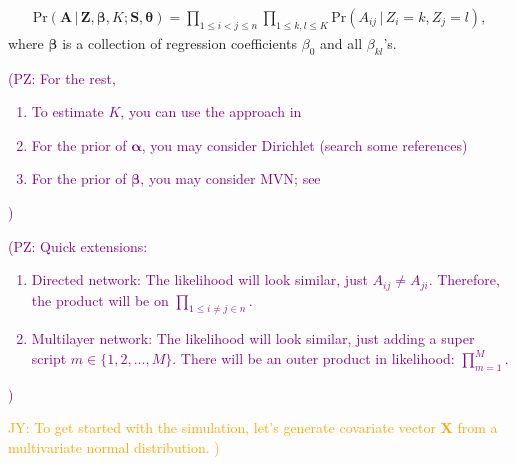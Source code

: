 \documentclass[12pt, titlepage, a4paper]{article}
\newcommand{\Prob}{\bm{\mathrm{Pr}}}
\newcommand{\given}{\, \vert \,}
\newcommand{\pz}[1]{\textcolor{purple}{(PZ: #1)}}
\newcommand{\jy}[1]{\textcolor{orange}{JY: #1)}}
\begin{document}
\begin{align*}
\Prob(\bm{A} \given \bm{Z}, \bm{\beta}, K; \bm{S}, \bm{\theta}) = 
\prod_{1 \le i < j \le n}\prod_{1 \le k, l \le K}\Prob(A_{ij}\given 
Z_i = k, Z_j = l),
\end{align*}
where $\bm{\beta}$ is a collection of regression coefficients 
$\beta_0$ and all $\beta_{kl}$'s.

\pz{For the rest,
\begin{enumerate}
\item To estimate $K$, you can use the approach 
in~\citet{geng2019probabilistic}
\item For the prior of $\bm{\alpha}$, you may consider Dirichlet 
(search some references)
\item For the prior of $\bm{\beta}$, you may consider MVN; 
see~\citet{handcock2007model}
\end{enumerate}
}

\pz{Quick extensions:
\begin{enumerate}
\item Directed network: The likelihood will look similar, just 
$A_{ij} \neq A_{ji}$. Therefore, the product will be on $\prod_{1 
\le i \neq 
j \in n}$.
\item Multilayer network: The likelihood will look similar, just 
adding a super script $m \in \{1, 2, \ldots, M\}$. There will be an 
outer product in likelihood: $\prod_{m = 1}^{M}$.
\end{enumerate}
}

\jy{To get started with the simulation, let's generate covariate vector $\bm X$
  from a multivariate normal distribution. }



	
\end{document}
